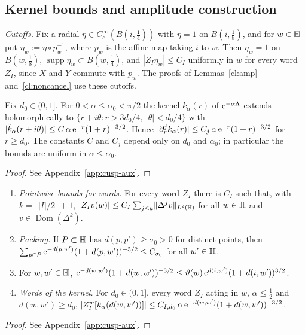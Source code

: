 \subsection{Kernel bounds and amplitude construction}\label{subsec:cl-kernels}
\emph{Cutoffs.} Fix a radial $\eta\in C_c^\infty(B(i,\tfrac14))$ with $\eta=1$ on $B(i,\tfrac18)$, and for $w\in\mathbb{H}$ put
$\eta_w:=\eta\circ p_w^{-1}$, where $p_w$ is the affine map taking $i$ to $w$. Then $\eta_w=1$ on $B(w,\tfrac18)$,
$\operatorname{supp}\eta_w\subset B(w,\tfrac14)$, and $|Z_I\eta_w|\le C_I$ uniformly in $w$ for every word $Z_I$, since $X$ and $Y$ commute with
$p_w$. The proofs of Lemmas~\ref{cl:amp} and~\ref{cl:noncancel} use these cutoffs.
\begin{lemma}\label{cl:kernel}
Fix $d_0\in(0,1]$. For $0<\alpha\le\alpha_0<\pi/2$ the kernel $k_\alpha(r)$ of $\mathrm{e}^{-\alpha\Lambda}$ extends holomorphically to
$\{r+i\theta:r>3d_0/4,\ |\theta|<d_0/4\}$ with $|\tilde k_\alpha(r+i\theta)|\le C\,\alpha\,\mathrm{e}^{-r}(1+r)^{-3/2}$. Hence
$|\partial_r^jk_\alpha(r)|\le C_j\,\alpha\,\mathrm{e}^{-r}(1+r)^{-3/2}$ for $r\ge d_0$. The constants $C$ and $C_j$ depend only on $d_0$
and $\alpha_0$; in particular the bounds are uniform in $\alpha\le\alpha_0$.
\end{lemma}
\begin{proof}
See Appendix~\ref{app:cusp-aux}.
\end{proof}

\begin{lemma}\label{cl:aux}
\begin{enumerate}
\item[(a)] \emph{Pointwise bounds for words.} For every word $Z_I$ there is $C_I$ such that, with $k=\lceil|I|/2\rceil+1$,
$|Z_Iv(w)|\le C_I\sum_{j\le k}\lVert \Delta^jv\rVert_{L^2(\mathbb{H})}$ for all $w\in\mathbb{H}$ and $v\in\operatorname{Dom}(\Delta^k)$.
\item[(b)] \emph{Packing.} If $P\subset\mathbb{H}$ has $d(p,p')\ge\sigma_0>0$ for distinct points, then
$\sum_{p\in P}\mathrm{e}^{-d(p,w')}(1+d(p,w'))^{-3/2}\le C_{\sigma_0}$ for all $w'\in\mathbb{H}$.
\item[(c)] For $w,w'\in\mathbb{H}$, $\mathrm{e}^{-d(w,w')}(1+d(w,w'))^{-3/2}\le\vartheta(w)\,\mathrm{e}^{d(i,w')}(1+d(i,w'))^{3/2}$.
\item[(d)] \emph{Words of the kernel.} For $d_0\in(0,1]$, every word $Z_I$ acting in $w$, $\alpha\le\tfrac12$ and $d(w,w')\ge d_0$,
$|Z_I^w[k_\alpha(d(w,w'))]|\le C_{I,d_0}\,\alpha\,\mathrm{e}^{-d(w,w')}(1+d(w,w'))^{-3/2}$.
\end{enumerate}
\end{lemma}
\begin{proof}
See Appendix~\ref{app:cusp-aux}.
\end{proof}

